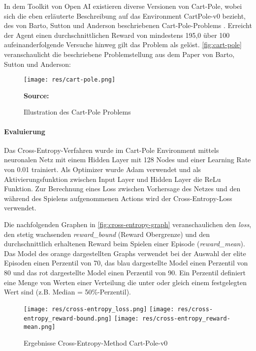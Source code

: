 \documentclass[11pt]{scrartcl}
\newcommand{\source}[1]{\vspace{-5pt} \caption*{\hfill \textbf{Source:} {#1}} }
\begin{document}
In dem Toolkit von Open AI existieren diverse Versionen von Cart-Pole, wobei sich die eben
erläuterte Beschreibung auf das Environment CartPole-v0 bezieht, des von Barto, Sutton und
Anderson beschriebenen Cart-Pole-Problems \cite[~S.838 f.]{BSA1983}. Erreicht der Agent einen
durchschnittlichen Reward von mindestens 195,0 über 100 aufeinanderfolgende Versuche hinweg gilt das
Problem als gelöst. \autoref{fig:cart-pole} veranschaulicht die beschriebene Problemstellung aus dem 
Paper\cite{BSA1983} von Barto, Sutton und Anderson:

\begin{figure}[htp]
\centering
\texttt{[image: res/cart-pole.png]}
\caption{Illustration des Cart-Pole Problems}
\source{\cite[~S.838]{BSA1983}}
\label{fig:cart-pole}
\end{figure}

\paragraph*{Evaluierung}
\noindent
\newline
Das Cross-Entropy-Verfahren wurde im Cart-Pole Environment mittels neuronalen Netz mit
einem Hidden Layer mit 128 Nodes und einer Learning Rate von 0.01 trainiert. Als
Optimizer wurde Adam verwendet und als Aktivierungsfunktion zwischen Input Layer und
Hidden Layer die ReLu Funktion. Zur Berechnung eines Loss zwischen Vorhersage des Netzes
und den während des Spielens aufgenommenen Actions wird der Cross-Entropy-Loss verwendet.

Die nachfolgenden Graphen in \autoref{fig:cross-entropy-graph} veranschaulichen den
\textit{loss}, den stetig wachsenden \textit{reward\_bound} (Reward Obergrenze) und den
durchschnittlich erhaltenen Reward beim Spielen einer Episode (\textit{reward\_mean}).
Das Model des orange dargestellten Graphs verwendet bei der Auswahl der elite Episoden
einen Perzentil von 70, das blau dargestellte Model einen Perzentil von 80 und das
rot dargestellte Model einen Perzentil von 90. Ein Perzentil definiert eine Menge von
Werten einer Verteilung die unter oder gleich einem festgelegten Wert sind (z.B. Median 
= 50\%-Perzentil). 

\begin{figure}[htp]
\centering
\texttt{[image: res/cross-entropy\_loss.png]}
\texttt{[image: res/cross-entropy\_reward-bound.png]}
\texttt{[image: res/cross-entropy\_reward-mean.png]}
\caption{Ergebnisse Cross-Entropy-Method Cart-Pole-v0}
\label{fig:cross-entropy-graph}
\end{figure}
\end{document}
